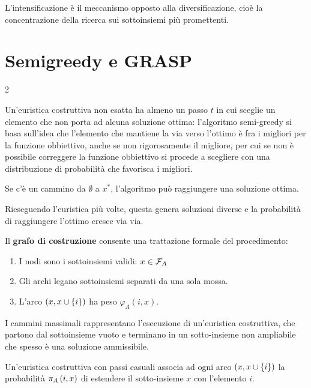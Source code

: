 \documentclass[\main/main.tex]{subfiles}
\begin{document}
\begin{definition}[Intensificazione]
L'intensificazione è il meccanismo opposto alla diversificazione, cioè la concentrazione della ricerca sui sottoinsiemi più promettenti.
\end{definition}
\clearpage
\section{Semigreedy e GRASP}
\begin{multicols}{2}
\begin{observation}
    Un’euristica costruttiva non esatta ha almeno un passo \(t\) in cui sceglie un elemento che non porta ad alcuna soluzione ottima: l'algoritmo semi-greedy si basa sull'idea che l'elemento che mantiene la via verso l'ottimo è fra i migliori per la funzione obbiettivo, anche se non rigorosamente il migliore, per cui se non è possibile correggere la funzione obbiettivo si procede a scegliere con una distribuzione di probabilità che favorisca i migliori.
\end{observation}
\begin{property}
    Se c'è un cammino da \(\emptyset\) a \(x^*\), l'algoritmo può raggiungere una soluzione ottima.
\end{property}
\begin{property}
    Rieseguendo l'euristica più volte, questa genera soluzioni diverse e la probabilità di raggiungere l'ottimo cresce via via.
\end{property}
\begin{definition}
    Il \textbf{grafo di costruzione} consente una trattazione formale del procedimento:
    \begin{enumerate}
        \item I nodi sono i sottoinsiemi validi: \(x \in \mathcal{F}_A\) %
        \item Gli archi legano sottoinsiemi separati da una sola mossa.
        \item L'arco \(\left(x, x \cup \left\{i\right\}\right)\) ha peso \(\varphi_A(i, x)\).
    \end{enumerate}
\end{definition}
\begin{observation}
I cammini massimali rappresentano l'esecuzione di un'euristica costruttiva, che partono dal sottoinsieme vuoto e terminano in un sotto-insieme non ampliabile che spesso è una soluzione ammissibile.
\end{observation}
\begin{observation}
    Un'euristica costruttiva con passi casuali associa ad ogni arco \(\left(x, x \cup \left\{i\right\}\right)\) la probabilità \(\pi_A\left(i, x\right)\) di estendere il sotto-insieme \(x\) con l'elemento \(i\).
    

\end{observation}
\end{multicols}
\end{document}

